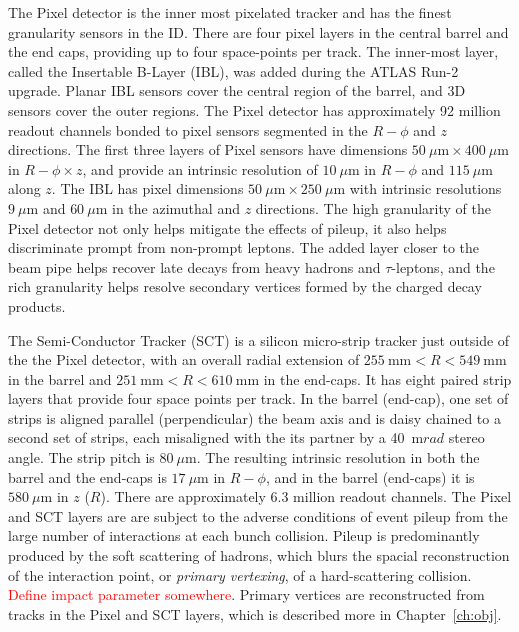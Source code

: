The Pixel detector is the inner most pixelated tracker and has the finest granularity sensors in the ID.  There are four pixel layers in the central barrel and the end caps, providing up to four space-points per track.  The inner-most layer, called the Insertable B-Layer (IBL), was added during the ATLAS Run-2 upgrade.  Planar IBL sensors cover the central region of the barrel, and 3D sensors cover the outer regions.  The Pixel detector has approximately 92 million readout channels bonded to pixel sensors segmented in the $R-\phi$ and $z$ directions.  The first three layers of Pixel sensors have dimensions $50~\mu \mathrm{m} \times 400~\mu \mathrm{m}$ in $R-\phi \times z$, and provide an intrinsic resolution of $10~\mu \mathrm{m}$ in $R-\phi$ and $115~\mu \mathrm{m}$ along $z$.  The IBL has pixel dimensions $50~\mu \mathrm{m} \times 250~\mu \mathrm{m}$ with intrinsic resolutions $9~\mu \mathrm{m}$ and $60~\mu \mathrm{m}$ in the azimuthal and $z$ directions.  The high granularity of the Pixel detector not only helps mitigate the effects of pileup, it also helps discriminate prompt from non-prompt leptons.  The added layer closer to the beam pipe helps recover late decays from heavy hadrons and $\tau$-leptons, and the rich granularity helps resolve secondary vertices formed by the charged decay products. 

The Semi-Conductor Tracker (SCT) is a silicon micro-strip tracker just outside of the the Pixel detector, with an overall radial extension of $255~\mathrm{mm} < R < 549~\mathrm{mm}$ in the barrel and $251~\mathrm{mm} < R < 610~\mathrm{mm}$ in the end-caps.  It has eight paired strip layers that provide four space points per track.  In the barrel (end-cap), one set of strips is aligned parallel (perpendicular) the beam axis and is daisy chained to a second set of strips, each misaligned with the its partner by a 40~$\mathrm{m}rad$ stereo angle.  The strip pitch is $80~\mu \mathrm{m}$.  The resulting intrinsic resolution in both the barrel and the end-caps is $17~\mu \mathrm{m}$ in  $R-\phi$, and in the barrel (end-caps) it is $580~\mu \mathrm{m}$ in $z$ ($R$).  There are approximately 6.3 million readout channels.  The Pixel and SCT layers are are subject to the adverse conditions of event pileup from the large number of interactions at each bunch collision.  Pileup is predominantly produced by the soft scattering of hadrons, which blurs the spacial reconstruction of the interaction point, or \textit{primary vertexing}, of a hard-scattering collision.  \textcolor{red}{Define impact parameter somewhere}.  Primary vertices are reconstructed from tracks in the Pixel and SCT layers, which is described more in Chapter~\ref{ch:obj}.

